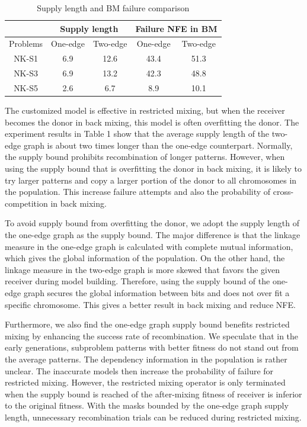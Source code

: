 \documentclass{sig-alternate-05-2015}
\begin{document}
\begin{table}[ht]
\begin{tabular}{|c|c|c|c|c|}
\hline
 &
\multicolumn{2}{c|}{Supply length} &
\multicolumn{2}{c|}{Failure NFE in BM} \\
\hline
Problems  & One-edge & Two-edge & One-edge & Two-edge \\\hline
NK-S1 &  6.9 &12.6  &43.4 & 51.3 \\\hline
NK-S3 & 6.9  & 13.2  &42.3 & 48.8 \\\hline
NK-S5 & 2.6  &6.7  &  8.9& 10.1 \\\hline

\end{tabular}
\caption{Supply length and BM failure comparison}
\end{table}


The customized model is effective in restricted mixing, but when the receiver becomes the donor in back mixing, this model is often overfitting the donor. The experiment results in Table 1 show that the average supply length of the two-edge graph is about two times longer than the one-edge counterpart. Normally, the supply bound prohibits recombination of longer patterns. However, when using the supply bound that is overfitting the donor in back mixing, it is likely to try larger patterns and copy a larger portion of the donor to all chromosomes in the population. This increase failure attempts and also the probability of cross-competition in back mixing. 

To avoid supply bound from overfitting the donor, we adopt the supply length of the one-edge graph as the supply bound. The major difference is that the linkage measure in the one-edge graph is calculated with complete mutual information, which gives the global information of the population. On the other hand, the linkage measure in the two-edge graph is more skewed that favors the given receiver during model building. Therefore, using the supply bound of the one-edge graph secures the global information between bits and does not over fit a specific chromosome. This gives a better result in back mixing and reduce NFE.


Furthermore, we also find the one-edge graph supply bound benefits restricted mixing by enhancing the success rate of recombination. We speculate that in the early generations, subproblem patterns with better fitness do not stand out from the average patterns. The dependency information in the population is rather unclear. The inaccurate models then increase the probability of failure for restricted mixing. However, the restricted mixing operator is only terminated when the supply bound is reached of the after-mixing fitness of receiver is inferior to the original fitness. With the masks bounded by the one-edge graph supply length, unnecessary recombination trials can be reduced during restricted mixing. 
\end{document}
